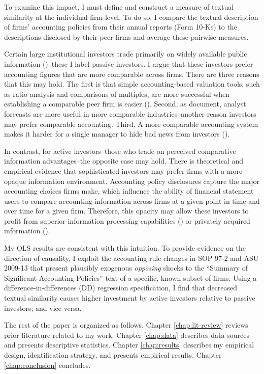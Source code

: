 \documentclass[thesis]{thesis-umich}
\begin{document}
To examine this impact, I must define and construct a measure of textual similarity at the individual firm-level. To do so, I compare the textual description of firms' accounting policies from their annual reports (Form 10-Ks) to the descriptions disclosed by their peer firms and average these pairwise measures. 

Certain large institutional investors trade primarily on widely available public information (\cite{busheegoodman2007})--these I label passive investors. I argue that these investors prefer accounting figures that are more comparable across firms. There are three reasons that this may hold. The first is that simple accounting-based valuation tools, such as ratio analysis and comparisons of multiples, are more successful when establishing a comparable peer firm is easier (\cite{bhojrajlee2002, youngzeng2015, leeetal2015}). Second, as \cite{bradshawetal2009} document, analyst forecasts are more useful in more comparable industries--another reason investors may prefer comparable accounting. Third, A more comparable accounting system makes it harder for a single manager to hide bad news from investors (\cite{kimetal2016}).

In contrast, for active investors--those who trade on perceived comparative information advantages--the opposite case may hold. There is theoretical and empirical evidence that sophisticated investors may prefer firms with a more opaque information environment. Accounting policy disclosures capture the major accounting choices firms make, which influence the ability of financial statement users to compare accounting information across firms at a given point in time and over time for a given firm. Therefore, this opacity may allow these investors to profit from superior information processing capabilities (\cite{kimverrecchia1994}) or privately acquired information (\cite{maffett2012}).

My OLS results are consistent with this intuition. To provide evidence on the direction of causality, I exploit the accounting rule changes in SOP 97-2 and \ac{ASU 2009-13} that present plausibly exogenous \emph{opposing} shocks to the ``Summary of Significant Accounting Policies'' text of a specific, known subset of firms. Using a difference-in-differences (DD) regression specification, I find that decreased textual similarity causes higher investment by active investors relative to passive investors, and vice-versa.

The rest of the paper is organized as follows. 
Chapter \ref{chap:lit-review} reviews prior literature related to my work. 
Chapter \ref{chap:data}  describes data sources and presents descriptive statistics. 
Chapter \ref{chap:results} describes my empirical design, identification strategy, and presents empirical results. 
Chapter \ref{chap:conclusion} concludes.
\end{document}
